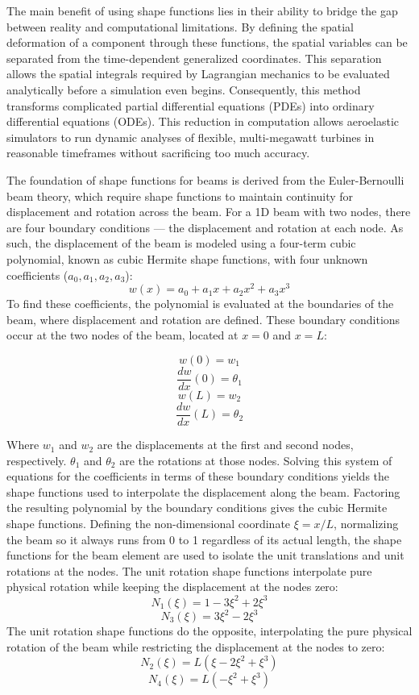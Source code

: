 \documentclass[final,onecolumn]{IEEEtran}
\begin{document}
The main benefit of using shape functions lies in their ability to bridge the gap between reality and computational limitations. By defining the spatial deformation of a component through these functions, the spatial variables can be separated from the time-dependent generalized coordinates. This separation allows the spatial integrals required by Lagrangian mechanics to be evaluated analytically before a simulation even begins. Consequently, this method transforms complicated partial differential equations (PDEs) into ordinary differential equations (ODEs). This reduction in computation allows aeroelastic simulators to run dynamic analyses of flexible, multi-megawatt turbines in reasonable timeframes without sacrificing too much accuracy.

The foundation of shape functions for beams is derived from the Euler-Bernoulli beam theory, which require shape functions to maintain continuity for displacement and rotation across the beam. For a 1D beam with two nodes, there are four boundary conditions — the displacement and rotation at each node. As such, the displacement of the beam is modeled using a four-term cubic polynomial, known as cubic Hermite shape functions, with four unknown coefficients ($a_0, a_1, a_2, a_3$):
$$w(x) = a_0 + a_1 x + a_2 x^2 + a_3 x^3$$
To find these coefficients, the polynomial is evaluated at the boundaries of the beam, where displacement and rotation are defined. These boundary conditions occur at the two nodes of the beam, located at $x=0$ and $x=L$:

$$w(0) = w_1$$
$$\frac{dw}{dx}(0) = \theta_1$$
$$w(L) = w_2$$
$$\frac{dw}{dx}(L) = \theta_2$$

Where $w_1$ and $w_2$ are the displacements at the first and second nodes, respectively. $\theta_1$ and $\theta_2$ are the rotations at those nodes. Solving this system of equations for the coefficients in terms of these boundary conditions yields the shape functions used to interpolate the displacement along the beam. Factoring the resulting polynomial by the boundary conditions gives the cubic Hermite shape functions. Defining the non-dimensional coordinate $\xi = x/L$, normalizing the beam so it always runs from 0 to 1 regardless of its actual length, the shape functions for the beam element are used to isolate the unit translations and unit rotations at the nodes. The unit rotation shape functions interpolate pure physical rotation while keeping the displacement at the nodes zero:
$$N_1(\xi) = 1 - 3\xi^2 + 2\xi^3$$
$$N_3(\xi) = 3\xi^2 - 2\xi^3$$
The unit rotation shape functions do the opposite, interpolating the pure physical rotation of the beam while restricting the displacement at the nodes to zero:
$$N_2(\xi) = L(\xi - 2\xi^2 + \xi^3)$$
$$N_4(\xi) = L(-\xi^2 + \xi^3)$$
\end{document}
